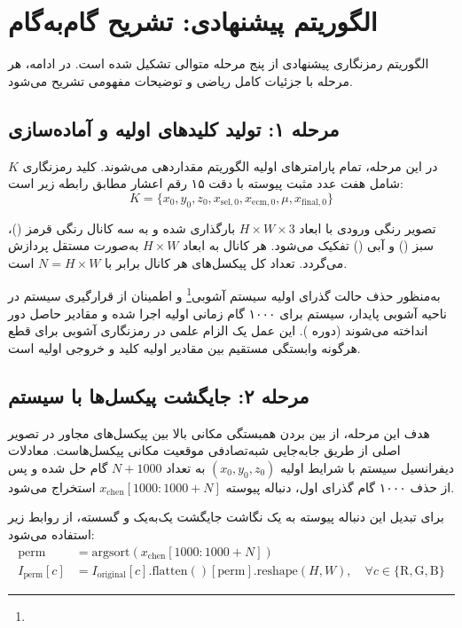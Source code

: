 \section{الگوریتم پیشنهادی: تشریح گام‌به‌گام}

الگوریتم رمزنگاری پیشنهادی از پنج مرحله متوالی تشکیل شده است. در ادامه، هر مرحله با جزئیات کامل ریاضی و توضیحات مفهومی تشریح می‌شود.

\subsection{مرحله ۱: تولید کلیدهای اولیه و آماده‌سازی}

در این مرحله، تمام پارامترهای اولیه الگوریتم مقداردهی می‌شوند. کلید رمزنگاری $K$ شامل هفت عدد مثبت پیوسته با دقت ۱۵ رقم اعشار مطابق رابطه زیر است:
\begin{equation}
K = \{x_0, y_0, z_0, x_{\mathrm{sel},0}, x_{\mathrm{ecm},0}, \mu, x_{\mathrm{final},0}\}
\label{eq:ch3-key-tuple}
\end{equation}

تصویر رنگی ورودی با ابعاد $H \times W \times 3$ بارگذاری شده و به سه کانال رنگی قرمز ()، سبز () و آبی () تفکیک می‌شود. هر کانال به ابعاد $H \times W$ به‌صورت مستقل پردازش می‌گردد. تعداد کل پیکسل‌های هر کانال برابر با $N = H \times W$ است.

به‌منظور حذف حالت گذرای اولیه سیستم آشوبی\footnote{} و اطمینان از قرارگیری سیستم در ناحیه آشوبی پایدار، سیستم  برای ۱۰۰۰ گام زمانی اولیه اجرا شده و مقادیر حاصل دور انداخته می‌شوند (دوره ). این عمل یک الزام علمی در رمزنگاری آشوبی برای قطع هرگونه وابستگی مستقیم بین مقادیر اولیه کلید و خروجی اولیه است.

\subsection{مرحله ۲: جایگشت پیکسل‌ها با سیستم }

هدف این مرحله، از بین بردن همبستگی مکانی بالا بین پیکسل‌های مجاور در تصویر اصلی از طریق جابه‌جایی شبه‌تصادفی موقعیت مکانی پیکسل‌هاست. معادلات دیفرانسیل سیستم  با شرایط اولیه $(x_0, y_0, z_0)$ به تعداد $N + 1000$ گام حل شده و پس از حذف ۱۰۰۰ گام گذرای اول، دنباله پیوسته $x_{\mathrm{chen}}[1000 : 1000+N]$ استخراج می‌شود.

برای تبدیل این دنباله پیوسته به یک نگاشت جایگشت یک‌به‌یک و گسسته، از روابط زیر استفاده می‌شود:
\begin{align}
\mathrm{perm} &= \mathrm{argsort}\left(x_{\mathrm{chen}}[1000:1000+N]\right) \label{eq:ch3-argsort} \\
I_{\mathrm{perm}}[c] &= I_{\mathrm{original}}[c].\mathrm{flatten()}[\mathrm{perm}].\mathrm{reshape}(H,W), \quad \forall c \in \{\mathrm{R}, \mathrm{G}, \mathrm{B}\} \label{eq:ch3-perm-apply}
\end{align}

